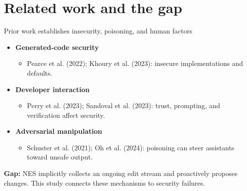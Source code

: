 \section{Related work and the gap}
\begin{frame}{Prior work establishes insecurity, poisoning, and human factors}
\begin{itemize}
\item \textbf{Generated-code security}
  \begin{itemize}
  \item \small Pearce et al. (2022); Khoury et al. (2023): insecure implementations and defaults.
  \end{itemize}
\item \textbf{Developer interaction}
  \begin{itemize}
  \item \small Perry et al. (2023); Sandoval et al. (2023): trust, prompting, and verification affect security.
  \end{itemize}
\item \textbf{Adversarial manipulation}
  \begin{itemize}
  \item \small Schuster et al. (2021); Oh et al. (2024): poisoning can steer assistants toward unsafe output.
  \end{itemize}
\end{itemize}
\medskip
\textbf{Gap:} NES implicitly collects an ongoing edit stream and proactively proposes changes. This study connects these mechanisms to security failures.
\end{frame}
